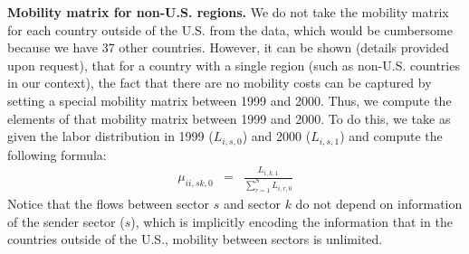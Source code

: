 \documentclass[12pt]{article}
\newcommand{\bs}{\small \begin{eqnarray*}}
\newcommand{\es}{\end{eqnarray*}}
\begin{document}
\textbf{Mobility matrix for non-U.S. regions.} We do not take the mobility matrix for each country outside of the U.S. from the data, which would be cumbersome because we have 37 other countries. However, it can be shown (details provided upon request), that for a country with a single region (such as non-U.S. countries in our context), the fact that there are no mobility costs can be captured by setting a special mobility matrix between 1999 and 2000. Thus, we compute the elements of that mobility matrix between 1999 and 2000. To do this, we take as given the labor distribution in 1999 ($L_{i,s,0}$) and 2000 ($L_{i,s,1}$) and compute the following formula:
\bs
\mu_{ii,sk,0} & = & \frac{L_{i,k,1}}{\sum_{r=1}^S L_{i,r,0}}
\es
Notice that the flows between sector $s$ and sector $k$ do not depend on information of the sender sector ($s$), which is implicitly encoding the information that in the countries outside of the U.S., mobility between sectors is unlimited.
\end{document}
